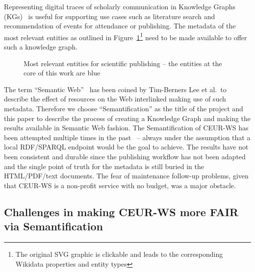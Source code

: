 \documentclass[]{ceurart}
\newcommand{\tquote}[1]{``#1''}
\begin{document}
Representing digital traces of scholarly communication in Knowledge Graphs (KGs)~\cite{Hogan_2021} is useful for supporting use cases such as literature search and recommendation of events for attendance or publishing. The metadata of the most relevant entities as outlined in Figure~\ref{fig:core_entities}\footnote{The original SVG graphic is clickable and leads to the corresponding Wikidata properties and entity types} need to be made available to offer such a knowledge graph.

\begin{figure}
    \centering
    
    \caption{Most relevant entities for scientific publishing -- the entities at the core of this work are blue}
     \label{fig:core_entities}
\end{figure}

The term \tquote{Semantic Web}~\cite{BernersLee2001} has been coined by Tim-Berners Lee et al.\ to describe the effect of resources on the Web interlinked making use of such metadata.
Therefore we choose \tquote{Semantification} as the title of the project and this paper to describe the process of creating a Knowledge Graph and making the results available in Semantic Web fashion. The Semantification of CEUR-WS has been attempted multiple times in the past~\cite{Lange2014,Sateli2015} -- always under the assumption that a local RDF/SPARQL endpoint would be the goal to achieve. The results have not been consistent and durable since the publishing workflow has not been adapted and the single point of truth for the metadata is still buried in the HTML/PDF/text documents. The fear of maintenance follow-up problems, given that CEUR-WS is a non-profit service with no budget, was a major obstacle. 

\subsection{Challenges in making CEUR-WS more FAIR via Semantification}\label{sec:fair_challenges}
\end{document}
